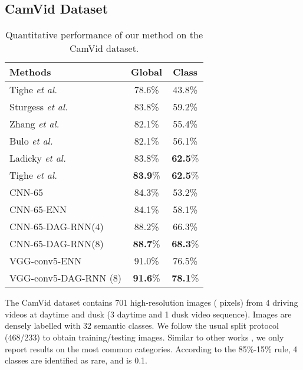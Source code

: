 \documentclass[10pt,twocolumn,letterpaper]{article}
\begin{document}
\subsection{CamVid Dataset}
\begin{table}[t]
\footnotesize
\begin{center}
\begin{tabular}{|l|cc|}
\hline
Methods & Global & Class \\
\hline
Tighe \emph{et al.}\cite{tighe2010superparsing} & 78.6\% & 43.8\% \\
Sturgess \emph{et al.}\cite{sturgess2009combining} & 83.8\% & 59.2\%\\
Zhang \emph{et al.}\cite{zhang2010semantic} & 82.1\% & 55.4\% \\
Bulo \emph{et al.}\cite{bulo2014neural} & 82.1\% & 56.1\% \\
Ladicky \emph{et al.}\cite{ladicky2010and} & 83.8\% & \textbf{62.5}\% \\
Tighe \emph{et al.} \cite{tighe2013finding} & \textbf{83.9}\% & \textbf{62.5}\% \\
\hline
CNN-65  & 84.3\% & 53.2\% \\
CNN-65-ENN & 84.1\% & 58.1\% \\
CNN-65-DAG-RNN(4) & 88.2\% & 66.3\% \\
CNN-65-DAG-RNN(8) & \textbf{88.7}\% & \textbf{68.3}\% \\
\hline
\hline
VGG-conv5-ENN & 91.0\% & 76.5\% \\
VGG-conv5-DAG-RNN (8) & \textbf{91.6}\% & \textbf{78.1}\% \\
\hline
\end{tabular}
\end{center}
\caption{Quantitative performance of our method on the CamVid dataset. }
\label{Table:result_CamVid}
\end{table}
The CamVid dataset \cite{BrostowSFC:ECCV08} contains 701 high-resolution images ( pixels) from 4 driving videos at daytime and dusk (3 daytime and 1 dusk video sequence). Images are densely labelled with 32 semantic classes. We follow the usual split protocol \cite{sturgess2009combining}\cite{tighe2013finding} (468/233) to obtain training/testing images. Similar to other works \cite{BrostowSFC:ECCV08}\cite{bulo2014neural}\cite{sturgess2009combining}\cite{tighe2013finding}, we only report results on the most common  categories. According to the 85\%-15\% rule, 4 classes are identified as rare, and  is 0.1.
\end{document}
